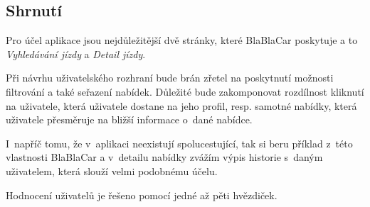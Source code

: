 
\newpage
\subsection{Shrnutí}
Pro účel aplikace jsou nejdůležitější dvě stránky, které BlaBlaCar poskytuje a to \textit{Vyhledávání jízdy} a \textit{Detail jízdy}.

Při návrhu uživatelského rozhraní bude brán zřetel na poskytnutí možnosti filtrování a také seřazení nabídek. Důležité bude zakomponovat rozdílnost kliknutí na uživatele, která uživatele dostane na jeho profil, resp. samotné nabídky, která uživatele přesměruje na bližší informace o~dané nabídce.

I~napříč tomu, že v~aplikaci neexistují spolucestující, tak si beru příklad z~této vlastnosti BlaBlaCar a v~detailu nabídky zvážím výpis historie s~daným uživatelem, která slouží velmi podobnému účelu.

Hodnocení uživatelů je řešeno pomocí jedné až pěti hvězdiček.